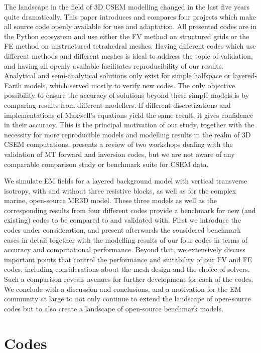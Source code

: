 \documentclass[a4paper, extra, camera,%
]{gji}
\begin{document}
The landscape in the field of 3D CSEM modelling changed in the last five years quite dramatically. This paper introduces and compares four projects which make all source code openly available for use and adaptation. All presented codes are in the Python ecosystem and use either the FV method on structured grids or the FE method on unstructured tetrahedral meshes. Having different codes which use different methods and different meshes is ideal to address the topic of validation, and having all openly available facilitates reproducibility of our results. Analytical and semi-analytical solutions only exist for simple halfspace or layered-Earth models, which served mostly to verify new codes. The only objective possibility to ensure the accuracy of solutions beyond these simple models is by comparing results from different modellers. If different discretizations and implementations of Maxwell's equations yield the same result, it gives confidence in their accuracy. This is the principal motivation of our study, together with the necessity for more reproducible models and modelling results in the realm of 3D CSEM computations. \cite{GJI.13.Miensopust} presents a review of two workshops dealing with the validation of MT forward and inversion codes, but we are not aware of any comparable comparison study or benchmark suite for CSEM data.

We simulate EM fields for a layered background model with vertical transverse isotropy, with and without three resistive blocks, as well as for the complex marine, open-source MR3D model. These three models as well as the corresponding results from four different codes provide a benchmark for new (and existing) codes to be compared to and validated with. First we introduce the codes under consideration, and present afterwards the considered benchmark cases in detail together with the modelling results of our four codes in terms of accuracy and computational performance. Beyond that, we extensively discuss important points that control the performance and suitability of our FV and FE codes, including considerations about the mesh design and the choice of solvers. Such a comparison reveals avenues for further development for each of the codes. We conclude with a discussion and conclusions, and a motivation for the EM community at large to not only continue to extend the landscape of open-source codes but to also create a landscape of open-source benchmark models.

\section{Codes}
\end{document}
